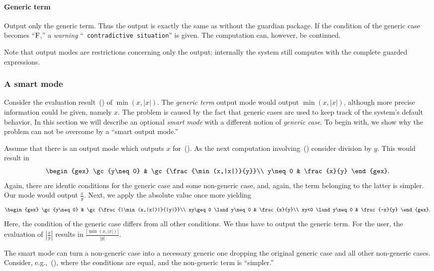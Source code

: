 \paragraph{Generic term} Output only the generic term. Thus the output
is exactly the same as without the guardian package. If the condition
of the generic case becomes ``$\textrm{F}$,'' a {\em warning} ``{\tt
contradictive situation}'' is given. The computation can, however, be
continued.\bigskip

Note that output modes are restrictions concerning only the output;
internally the system still computes with the complete guarded
expressions.
%
\subsubsection{A smart mode}\label{smartmode}
Consider the evaluation result~() of $\min(x,|x|)$. The
{\em generic term} output mode would output $\min(x,|x|)$, although
more precise information could be given, namely $x$. The problem is
caused by the fact that generic cases are used to keep track of the
system's default behavior. In this section we will describe an
optional {\em smart mode} with a different notion of {\em generic
case}. To begin with, we show why the problem can not be overcome by a
``smart output mode.''

Assume that there is an output mode which outputs $x$
for~(). As the next computation involving~()
consider division by $y$. This would result in
\[
\begin{gex}
\gc{y\neq0} & \gc{\frac{\min(x,|x|)}{y}}\\
y\neq0 & \frac{x}{y}
\end{gex}.
\]
Again, there are identic conditions for the generic case and some
non-generic case, and, again, the term belonging to the latter is
simpler. Our mode would output $\frac{x}{y}$. Next, we apply the
absolute value once more yielding
\[
\begin{gex}
\gc{y\neq 0} & \gc{\frac{|\min(x,|x|)|}{|y|}}\\
xy\geq0 \land y\neq0 & \frac{x}{y}\\
xy<0 \land y\neq0 & \frac{-x}{y}
\end{gex}.
\]
Here, the condition of the generic case differs from all other
conditions. We thus have to output the generic term. For the user, the
evaluation of $|\frac{x}{y}|$ results in $\frac{|\min(x,|x|)|}{|y|}$.

The smart mode can turn a non-generic case into a necessary generic
one dropping the original generic case and all other non-generic
cases. Consider, e.g.,~(), where the conditions are equal,
and the non-generic term is ``simpler.''

